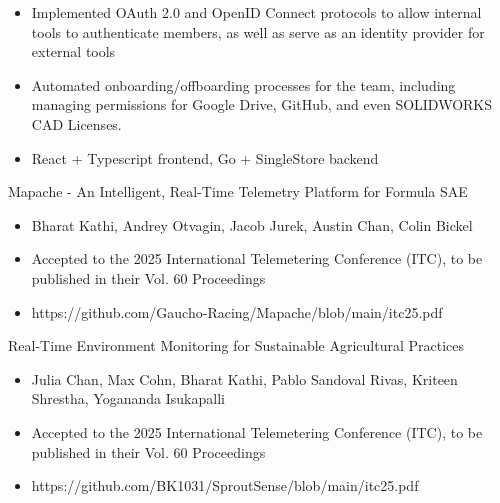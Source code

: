 \documentclass[9pt]{developercv} %
\begin{document}
\begin{entrylist}
{\begin{itemize}[noitemsep,topsep=0pt,parsep=0pt,partopsep=0pt, leftmargin=10pt]
            \item Implemented OAuth 2.0 and OpenID Connect protocols to allow internal tools to authenticate members, as well as serve as an identity provider for external tools
            \item Automated onboarding/offboarding processes for the team, including managing permissions for Google Drive, GitHub, and even SOLIDWORKS CAD Licenses.
            \item React + Typescript frontend, Go + SingleStore backend
        \end{itemize}}
\end{entrylist}
\vspace{-10pt}

\begin{entrylist}
    \entry
		{}
		{Mapache - An Intelligent, Real-Time Telemetry Platform for Formula SAE}
		{}
		{\vspace{-8pt}
        \begin{itemize}[noitemsep,topsep=0pt,parsep=0pt,partopsep=0pt, leftmargin=10pt]
            \item Bharat Kathi, Andrey Otvagin, Jacob Jurek, Austin Chan, Colin Bickel
            \item Accepted to the 2025 International Telemetering Conference (ITC), to be published in their Vol. 60 Proceedings
            \item https://github.com/Gaucho-Racing/Mapache/blob/main/itc25.pdf
        \end{itemize}}
    \entry
		{}
		{Real-Time Environment Monitoring for Sustainable Agricultural Practices}
		{}
		{\vspace{-8pt}
        \begin{itemize}[noitemsep,topsep=0pt,parsep=0pt,partopsep=0pt, leftmargin=10pt]
            \item Julia Chan, Max Cohn, Bharat Kathi, Pablo Sandoval Rivas, Kriteen Shrestha, Yogananda Isukapalli
            \item Accepted to the 2025 International Telemetering Conference (ITC), to be published in their Vol. 60 Proceedings
            \item https://github.com/BK1031/SproutSense/blob/main/itc25.pdf
        \end{itemize}}
\end{entrylist}
\vspace{-10pt}
\end{document}
